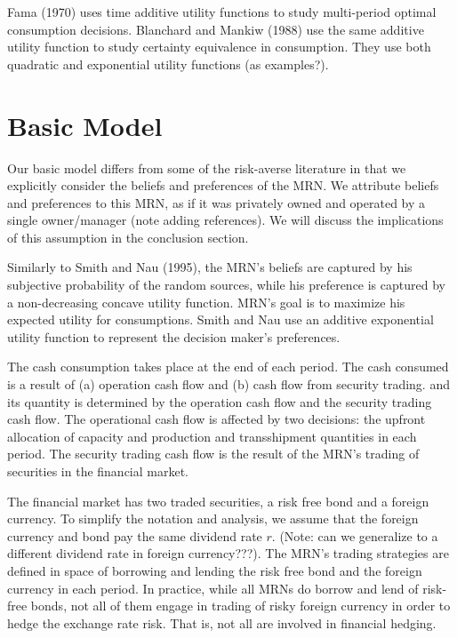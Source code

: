\documentclass{article}[12pt letter]
\begin{document}
Fama (1970) uses time additive utility functions to study multi-period optimal consumption decisions.  Blanchard and Mankiw (1988) use the same additive utility function to study certainty equivalence in consumption. They use both quadratic and exponential utility functions (as examples?).

\section{Basic Model \label{sect:basicModel}}


Our basic model differs from some of the risk-averse literature in that we explicitly consider the beliefs and preferences of the MRN. We attribute beliefs and preferences to this MRN, as if it was privately owned and operated by a single owner/manager (note adding references). We will discuss the implications of this assumption in the conclusion section.

Similarly to Smith and Nau (1995), the MRN's beliefs are captured by his subjective probability of the random sources, while his preference is captured by a non-decreasing concave utility function. MRN's goal is to maximize his expected utility for consumptions. Smith and Nau use an additive exponential utility function to represent the decision maker's preferences.


The cash consumption takes place at the end of each period. The cash consumed is  a result of (a) operation cash flow and (b) cash flow from security trading.  and its quantity is determined by the operation cash flow and the security trading cash flow. The operational cash flow is affected by two decisions: the upfront allocation of capacity and production and transshipment quantities in each period.  The security trading cash flow is the result of the MRN's trading of securities in the financial market.

The financial market has two traded securities, a risk free bond and a foreign currency. To simplify the notation and analysis, we assume that the foreign currency and bond pay the same dividend rate $r$.  (Note: can we generalize to a different dividend rate in foreign currency???). The MRN's trading strategies are defined in space of  borrowing and lending the risk free bond and the foreign currency in each period. In practice, while all MRNs do borrow and lend of risk-free bonds, not all of them engage in trading of risky foreign currency in order to hedge the exchange rate risk. That is, not all are involved in financial hedging.
\end{document}
